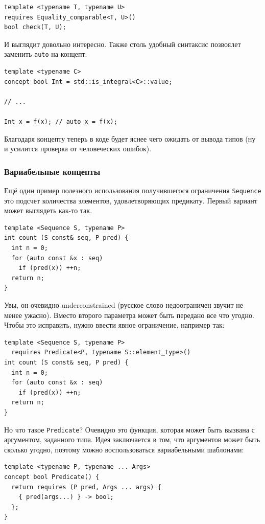 \documentclass[a4paper,12pt,oneside]{article}
\begin{document}
\begin{lstlisting}
template <typename T, typename U>
requires Equality_comparable<T, U>()
bool check(T, U);
\end{lstlisting}

И выглядит довольно интересно. Также столь удобный синтаксис позвоялет заменить \lstinline!auto! на концепт:

\begin{lstlisting}
template <typename C> 
concept bool Int = std::is_integral<C>::value;

// ...

Int x = f(x); // auto x = f(x);
\end{lstlisting}

Благодаря концепту теперь в коде будет яснее чего ожидать от вывода типов (ну и усилится проверка от человеческих ошибок).

\subsubsection{Вариабельные концепты}

Ещё один пример полезного использования получившегося ограничения \lstinline!Sequence! это подсчет количества элементов, удовлетворяющих предикату. Первый вариант может выглядеть как-то так.

\begin{lstlisting}
template <Sequence S, typename P>
int count (S const& seq, P pred) {
  int n = 0;
  for (auto const &x : seq)
    if (pred(x)) ++n;
  return n;
}
\end{lstlisting}

Увы, он очевидно underconstrained (русское слово недоограничен звучит не менее ужасно). Вместо второго параметра может быть передано все что угодно. Чтобы это исправить, нужно ввести явное ограничение, например так:

\begin{lstlisting}
template <Sequence S, typename P>
  requires Predicate<P, typename S::element_type>()
int count (S const& seq, P pred) {
  int n = 0;
  for (auto const &x : seq)
    if (pred(x)) ++n;
  return n;
}
\end{lstlisting}

Но что такое \lstinline!Predicate!? Очевидно это функция, которая может быть вызвана с аргументом, заданного типа. Идея заключается в том, что аргументов может быть сколько угодно, поэтому можно воспользоваться вариабельными шаблонами:

\begin{lstlisting}
template <typename P, typename ... Args>
concept bool Predicate() {
  return requires (P pred, Args ... args) {
    { pred(args...) } -> bool;
  };
}
\end{lstlisting}
\end{document}
